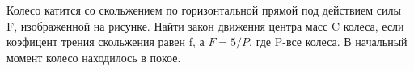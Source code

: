 Колесо катится со скольжением по горизонтальной прямой под действием силы F, изображенной на рисунке. Найти закон движения центра масс C колеса, если коэфицент трения 
скольжения равен f, а $F=5/P$, где P-все колеса. В начальный момент колесо находилось в покое.
